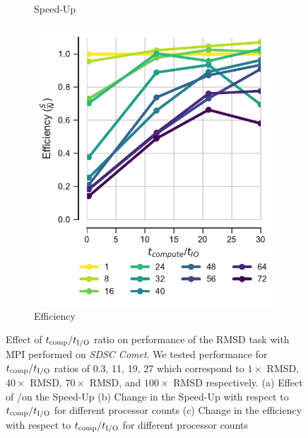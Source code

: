 \begin{figure}[ht!]
\begin{subfigure}{.3\textwidth}
  \caption{Speed-Up}
  \label{fig:S2_tcomp_tIO_effect}
\end{subfigure}
\hfill
\begin{subfigure}{.3\textwidth}
  \includegraphics[width=\linewidth]{figures/Compute_to_IO_ratio_on_performance_2d_3_v17.pdf}
  \caption{Efficiency}
  \label{fig:E_tcomp_tIO_effect}
\end{subfigure}
%
\caption{Effect of ${t}_{\text{comp}}/{t}_{\text{I/O}}$ ratio on performance of the RMSD task with MPI performed on \emph{SDSC Comet}. We tested performance for ${t}_{\text{comp}}/{t}_{\text{I/O}}$ ratios of 0.3, 11, 19, 27 
which correspond to $1\times$ RMSD, $40\times$ RMSD, $70\times$ RMSD, and $100\times$ RMSD respectively. (a) Effect of \tcomp/\tIO on the Speed-Up
(b) Change in the Speed-Up with respect to ${t}_{\text{comp}}/{t}_{\text{I/O}}$ for different processor counts (c) Change in the efficiency with respect to ${t}_{\text{comp}}/{t}_{\text{I/O}}$ for different processor counts}
\label{fig:tcomp_tIO_effect}
\end{figure}

